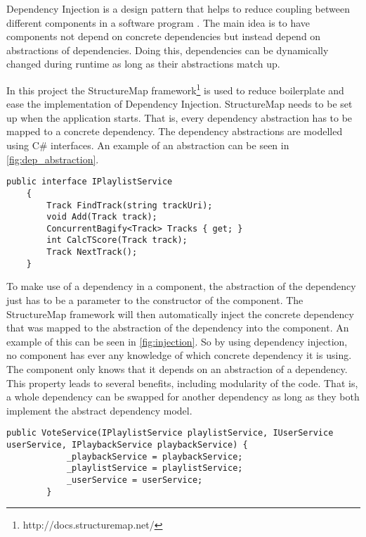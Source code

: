 Dependency Injection is a design pattern that helps to reduce coupling
between different components in a software program \cite{injection}. The main idea is
to have components not depend on concrete dependencies but instead
depend on abstractions of dependencies. Doing this, dependencies can
be dynamically changed during runtime as long as their abstractions
match up.

In this project the StructureMap framework\footnote{http://docs.structuremap.net/} is used to reduce
boilerplate and ease the implementation of Dependency
Injection. StructureMap needs to be set up when the application
starts. That is, every dependency abstraction has to be mapped to a
concrete dependency. The dependency abstractions are modelled using
C\# interfaces. An example of an abstraction can be seen in \cref{fig:dep_abstraction}.

\begin{lstlisting}[caption = {Abstraction of a dependency abstraction
    using C\# interfaces. A concrete dependency has to implement the
    methods described in the abstraction.}, label={fig:dep_abstraction}]
public interface IPlaylistService
    {
        Track FindTrack(string trackUri);
        void Add(Track track);
        ConcurrentBagify<Track> Tracks { get; }
        int CalcTScore(Track track);
        Track NextTrack();
    }
\end{lstlisting}

To make use of a dependency in a component, the abstraction of the
dependency just has to be a parameter to the constructor of the
component. The StructureMap framework will then automatically inject
the concrete dependency that was mapped to the abstraction of the
dependency into the component. An example of this can be seen in
\cref{fig:injection}. So by using dependency injection, no component
has ever any knowledge of which concrete dependency it is using. The
component only knows that it depends on an abstraction of a
dependency. This property leads to several benefits, including
modularity of the code. That is, a whole dependency can be swapped for
another dependency as long as they both implement the abstract
dependency model.

\begin{lstlisting}[caption = {Dependency Injection through class
    constructors. IPlaylistService, IUserService and IPlaybackService
    are all abstractions of dependencies.}, label={fig:injection}]
public VoteService(IPlaylistService playlistService, IUserService userService, IPlaybackService playbackService) {
            _playbackService = playbackService;
            _playlistService = playlistService;
            _userService = userService;
        }
\end{lstlisting}
